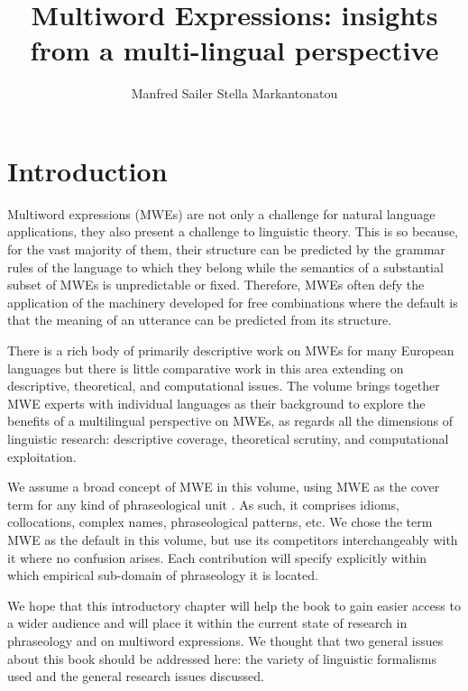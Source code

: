\documentclass[output=paper]{langsci/langscibook}
\author{Manfred Sailer\affiliation{Institute for English and American Studies, Goethe University Frankfurt/Main}%
\lastand Stella Markantonatou\affiliation{Institute for Language and Speech Processing, Athena RIC, Greece}}
\title{Multiword Expressions: insights from a multi-lingual perspective}
\begin{document}
\section{Introduction}\label{Sec-Introduction} 
Multiword expressions (MWEs) are not only a challenge for natural language applications, they also present a challenge to linguistic theory. This is so because, for the vast majority of them, their structure can be predicted by the grammar rules of the language to which they belong while the semantics of a substantial subset of MWEs is unpredictable or fixed. 
Therefore, MWEs often defy the application of the machinery developed for free combinations where the default is that the meaning of an utterance can be predicted from its structure.



There is a rich body of primarily descriptive work on MWEs for many European languages but there is little comparative work in this area extending on descriptive, theoretical, and computational issues. 
%
The volume brings together MWE experts with individual languages as their background to explore the benefits of a multilingual perspective on MWEs, as regards all the dimensions of linguistic research: descriptive coverage, theoretical scrutiny, and computational exploitation. 

We assume a broad concept of MWE in this volume, using MWE as the cover term for any kind of phraseological unit . As such, it comprises idioms, collocations, complex names, phraseological patterns, etc. We chose the term MWE as the default in this volume, but use its competitors interchangeably with it where no confusion arises. Each contribution will specify explicitly within which empirical sub-domain of phraseology it is located.

We hope that this introductory chapter will help the book to gain easier access to a wider audience and will place it within the current state of research in phraseology and on multiword expressions. We thought that two general issues about this book should be addressed here: the variety of linguistic formalisms used and the general research issues discussed. 
\end{document}

